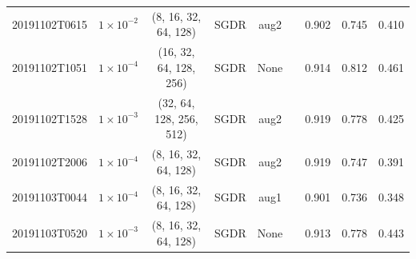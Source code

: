 \begin{table}[!ht]
\begin{adjustbox}{width=\columnwidth, center}
\begin{tabular}{ccccccccc}
			20191102T0615                        & $1\times10^{-2}$                                   & (8, 16, 32, 64, 128)                        & SGDR                                & aug2                                                                                      & \cmark                                                                                     & 0.902          & 0.745          & 0.410          \\
			20191102T1051                        & $1\times10^{-4}$                                 & (16, 32, 64, 128, 256)                      & SGDR                                & None                                                                                      & \xmark                                                                                     & 0.914          & 0.812          & 0.461          \\
			20191102T1528                        & $1\times10^{-3}$                                  & (32, 64, 128, 256, 512)                     & SGDR                                & aug2                                                                                      & \cmark                                                                                     & 0.919          & 0.778          & 0.425          \\
			20191102T2006                        & $1\times10^{-4}$                                 & (8, 16, 32, 64, 128)                        & SGDR                                & aug2                                                                                      & \cmark                                                                                     & 0.919          & 0.747          & 0.391          \\
			20191103T0044                        & $1\times10^{-4}$                                 & (8, 16, 32, 64, 128)                        & SGDR                                & aug1                                                                                      & \cmark                                                                                     & 0.901          & 0.736          & 0.348          \\
			20191103T0520                        & $1\times10^{-3}$                                  & (8, 16, 32, 64, 128)                        & SGDR                                & None                                                                                      & \cmark                                                                                     & 0.913          & 0.778          & 0.443          \\

\end{tabular}
\end{adjustbox}
\end{table}
